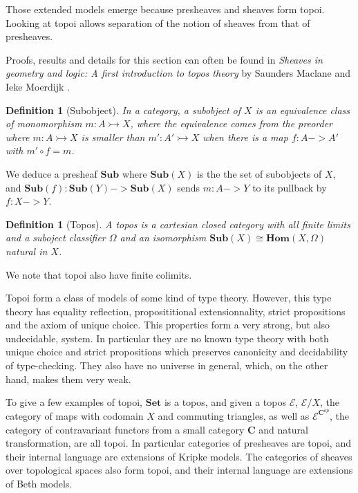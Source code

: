 \documentclass[11pt]{article}
\newtheorem{definition}[theorem]{Definition}
\newcommand{\0}{\mathbf{0}}
\newcommand{\1}{\mathbf{1}}
\newcommand{\mono}{\rightarrowtail}
\begin{document}
Those extended models emerge because presheaves and sheaves form topoi. Looking at topoi allows separation of the notion of sheaves from that of presheaves.

Proofs, results and details for this section can often be found in \emph{Sheaves in geometry and logic: A first introduction to topos theory} by Saunders Maclane and Ieke Moerdijk \cite{maclane2012sheaves}.

\begin{definition}[Subobject]
    In a category, a \emph{subobject} of $X$ is an equivalence class of monomorphism $m : A \mono X$, where the equivalence comes from the preorder where $ m : A \mono X $ is smaller than $ m' : A' \mono X$ when there is a map $f : A -> A'$ with $ m' \circ f = m$.
\end{definition}

We deduce a presheaf $\mathbf{Sub}$ where $\mathbf{Sub}(X)$ is the the set of subobjects of $X$, and $\mathbf{Sub}(f) : \mathbf{Sub}(Y) -> \mathbf{Sub}(X)$ sends $m : A -> Y$ to its pullback by $f : X -> Y $. 

\begin{definition}[Topos]\label{topos}
    A \emph{topos} is a cartesian closed category with all finite limits and a suboject \emph{classifier} $\Omega$ and an isomorphism $\mathbf{Sub}(X)\cong \mathbf{Hom}(X, \Omega)$ natural in $X$.
\end{definition}

We note that topoi also have finite colimits.

Topoi form a class of models of some kind of type theory.
However, this type theory has equality reflection, proposititional extensionnality, strict propositions and the axiom of unique choice. This properties form a very strong, but also undecidable, system. In particular they are no known type theory with both unique choice and strict propositions which preserves canonicity and decidability of type-checking. They also have no universe in general, which, on the other hand, makes them very weak.


To give a few examples of topoi, $\mathbf{Set}$ is a topos, and given a topos $\mathcal E$, $\mathcal{E}/X$, the category of maps with codomain $X$ and commuting triangles, as well as $\mathcal{E}^{\mathbf{C}^{op}}$, the category of contravariant functors from a small category $\mathbf{C}$ and natural transformation, are all topoi. In particular categories of presheaves are topoi, and their internal language are extensions of Kripke models. The categories of sheaves over topological spaces also form topoi, and their internal language are extensions of Beth models.
\end{document}
